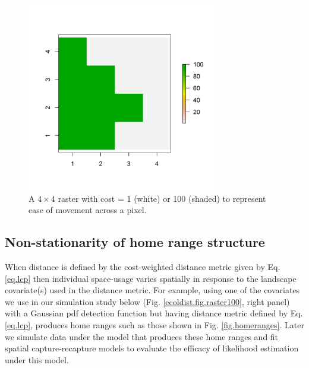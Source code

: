 \documentclass[12pt]{article}
\begin{document}
\begin{figure}
\begin{center}
\includegraphics[height=3.25in,width=3.25in]{figs/raster_2values}
\end{center}
\caption{A $4 \times 4$ raster with cost = 1 (white) or 100 (shaded) to represent ease of movement across a pixel.}
\label{ecoldist.fig.raster}
\end{figure}

\subsection{Non-stationarity of home range structure}

When distance is defined by the cost-weighted distance metric given
by Eq. \ref{eq.lcp} then individual space-usage varies
spatially in response to the landscape covariate(s) used in the
distance metric. For example, using one of the covariates we use in
our simulation study below (Fig. \ref{ecoldist.fig.raster100}, right
panel) with a Gaussian pdf detection function but having distance
metric defined by Eq. \ref{eq.lcp}, produces home ranges such
as those shown in Fig. \ref{fig.homeranges}. Later we simulate data
under the model that produces these home ranges and fit spatial
capture-recapture models to evaluate the efficacy of likelihood
estimation under this model. 
\end{document}
